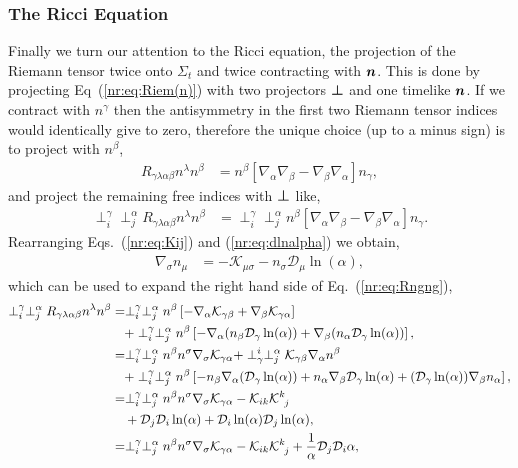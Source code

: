 \subsubsection{The Ricci Equation}
Finally we turn our attention to the Ricci equation, the projection of the Riemann tensor twice onto $\Sigma_t$ and twice contracting with $\boldsymbol{n}$. This is done by projecting Eq~(\ref{nr:eq:Riem(n)}) with two projectors $\boldsymbol{\perp}$ and one timelike $\boldsymbol{n}$. If we contract with $n^\gamma$ then the antisymmetry in the first two Riemann tensor indices would identically give to zero, therefore the unique choice (up to a minus sign) is to project with $n^\beta$,
\begin{align}
R_{\gamma\lambda\alpha\beta}n^\lambda n^\beta &=
 n^\beta \left[ \nabla_\alpha\nabla_\beta-\nabla_\beta\nabla_\alpha\right]n_\gamma,
\end{align}
and project the remaining free indices with $\boldsymbol{\perp}$ like,
\begin{align} \label{nr:eq:Rngng}
\perp_i^\gamma \perp^\alpha_j R_{\gamma\lambda\alpha\beta}n^\lambda n^\beta &=
 \perp_i^\gamma \perp^\alpha_j n^\beta \left[ \nabla_\alpha\nabla_\beta-\nabla_\beta\nabla_\alpha\right]n_\gamma.
\end{align}
Rearranging Eqs.~(\ref{nr:eq:Kij}) and (\ref{nr:eq:dlnalpha}) we obtain,
\begin{align} \nabla_\sigma n_\mu &= -\mathcal{K}_{\mu\sigma}-n_\sigma \mathcal{D}_\mu \ln(\alpha),
\end{align}
which can be used to expand the right hand side of Eq.~(\ref{nr:eq:Rngng}),
\begin{align} \label{nr:eq:Rngng}
\perp_i^\gamma \perp^\alpha_j R_{\gamma\lambda\alpha\beta}n^\lambda n^\beta &=
 \perp_i^\gamma \perp^\alpha_j n^\beta \left[ -\nabla_\alpha\mathcal{K}_{\gamma\beta}+\nabla_\beta \mathcal{K}_{\gamma\alpha}\right]  \\ \nonumber&\quad+
 \perp_i^\gamma \perp^\alpha_j n^\beta \left[ -\nabla_\alpha (n_\beta \mathcal{D}_\gamma \ln(\alpha)) +\nabla_\beta (n_\alpha \mathcal{D}_\gamma \ln(\alpha))\right], \\
 &=
 \perp_i^\gamma \perp^\alpha_j n^\beta n^\sigma \nabla_\sigma \mathcal{K}_{\gamma\alpha} +  \perp^i_\gamma \perp^\alpha_j   \mathcal{K}_{\gamma\beta} \nabla_\alpha n^\beta  \\ \nonumber&\quad+
 \perp_i^\gamma \perp^\alpha_j n^\beta \left[ -n_\beta \nabla_\alpha ( \mathcal{D}_\gamma \ln(\alpha)) +n_\alpha \nabla_\beta \mathcal{D}_\gamma \ln(\alpha)
 + ( \mathcal{D}_\gamma \ln(\alpha))  \nabla_\beta n_\alpha\right], \\
  &=
 \perp_i^\gamma \perp^\alpha_j n^\beta n^\sigma \nabla_\sigma \mathcal{K}_{\gamma\alpha} -   \mathcal{K}_{ik} \mathcal{K}^k_{\,\,\,j}  \\ \nonumber&\quad+
 \mathcal{D}_j \mathcal{D}_i \ln(\alpha) + \mathcal{D}_i \ln(\alpha) \mathcal{D}_j \ln(\alpha)   , \\
 &=
 \perp_i^\gamma \perp^\alpha_j n^\beta n^\sigma \nabla_\sigma \mathcal{K}_{\gamma\alpha} -   \mathcal{K}_{ik} \mathcal{K}^k_{\,\,\,j}  + \frac{1}{\alpha} \mathcal{D}_j \mathcal{D}_i \alpha   ,
\end{align}
